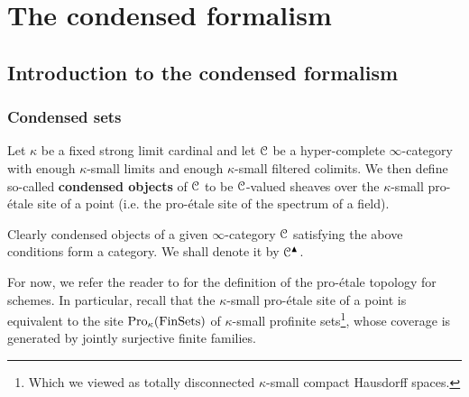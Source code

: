 \section{The condensed formalism} \label{section: condensed_mathematics}
    \subsection{Introduction to the condensed formalism}
        \subsubsection{Condensed sets}
            \begin{definition} \label{def: condensed_objects}
                Let $\kappa$ be a fixed strong limit cardinal and let $\mathcal{C}$ be a hyper-complete $\infty$-category with enough $\kappa$-small limits and enough $\kappa$-small filtered colimits. We then define so-called \textbf{condensed objects} of $\mathcal{C}$ to be $\mathcal{C}$-valued sheaves over the $\kappa$-small pro-\'etale site of a point (i.e. the pro-\'etale site of the spectrum of a field). 
                
                Clearly condensed objects of a given $\infty$-category $\mathcal{C}$ satisfying the above conditions form a category. We shall denote it by $\mathcal{C}^{\blacktriangle}$.
            \end{definition}
            \begin{remark}
                For now, we refer the reader to \cite[Definition 4.1.1 and Remark 4.1.3]{bhatt_scholze_2014_pro_etale} for the definition of the pro-\'etale topology for schemes. In particular, recall that the $\kappa$-small pro-\'etale site of a point is equivalent to the site $\mathrm{Pro}_{\kappa}(\mathrm{Fin}\mathrm{Sets})$ of $\kappa$-small profinite sets\footnote{Which we viewed as totally disconnected $\kappa$-small compact Hausdorff spaces.}, whose coverage is generated by jointly surjective finite families. 
            \end{remark}
